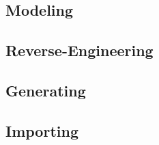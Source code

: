 \subsection{Modeling}

\subsection{Reverse-Engineering}

\subsection{Generating}

\subsection{Importing}
